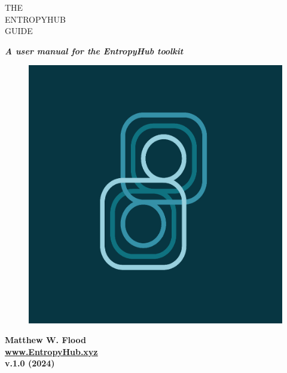 \begin{titlepage}
\color{ehone}
\fontsize{60pt}{72pt}
\noindent THE \\ ENTROPYHUB \\ GUIDE\\ 
\vspace{5mm}
\normalfont		
   \begin{center}
    \Large
	\noindent \textbf{\textit{A user manual for the EntropyHub toolkit}} \\
   \end{center}
 
\vspace{7cm}
\begin{figure}
\includegraphics[width=1\linewidth]{EntropyHub_profiler.png} 
\label{fig:wrapfig}
\end{figure}

\normalsize 
\noindent \textbf{Matthew W. Flood}	
\newline \\ \newline
\noindent \href{https://www.EntropyHub.xyz}{\ul{\textbf{www.EntropyHub.xyz}}} 
\newline \\ \newline
\noindent \textbf{v.1.0 (2024)}

\normalsize
\color{black}
\end{titlepage}



